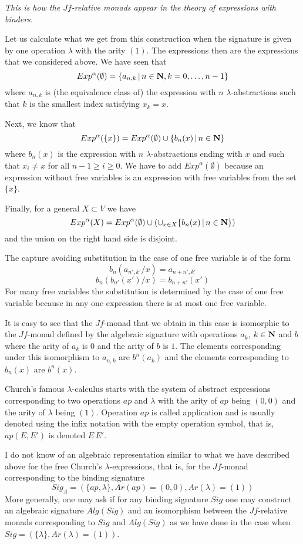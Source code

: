 \documentclass[12pt]{amsart}
\newcommand{\nn}{{\bf N\rm}}
\newcommand{\nat}{\nn}
\begin{document}
{\em This is how the $Jf$-relative monads appear in the theory of expressions with binders.}

Let us calculate what we get from this construction when the signature is given by one operation $\lambda$ with the arity $(1)$. The expressions then are the expressions that we considered above. We have seen that 
%
$$Exp^{\alpha}(\emptyset)=\{a_{n,k}\,|\,n\in\nat,k=0,\dots,n-1\}$$
%
where $a_{n,k}$ is (the equivalence class of) the expression with $n$ $\lambda$-abstractions such that $k$ is the smallest index satisfying $x_k=x$. 

Next, we know that
%
$$Exp^{\alpha}(\{x\})=Exp^{\alpha}(\emptyset)\cup \{b_n(x)\,|\,n\in \nat\}$$
%
where $b_n(x)$ is the expression with $n$ $\lambda$-abstractions ending with $x$ and such that $x_i\ne x$ for all $n-1\ge i\ge 0$. We have to add $Exp^{\alpha}(\emptyset)$ because an expression without free variables is an expression with free variables from the set $\{x\}$. 

Finally, for a general $X\subset V$ we have
%
$$Exp^{\alpha}(X)=Exp^{\alpha}(\emptyset)\cup (\cup_{x\in X}\{b_n(x)\,|\,n\in \nat\})$$
%
and the union on the right hand side is disjoint. 

The capture avoiding substitution in the case of one free variable is of the form
%
$$b_n(a_{n',k'}/x)=a_{n+n',k'}$$
$$b_n(b_{n'}(x')/x)=b_{n+n'}(x')$$
%
For many free variables the substitution is determined by the case of one free variable because in any one expression there is at most one free variable. 

It is easy to see that the $Jf$-monad that we obtain in this case is isomorphic to the $Jf$-monad defined by the algebraic signature with operations $a_k$, $k\in\nat$ and $b$ where the arity of $a_k$ is $0$ and the arity of $b$ is $1$. The elements corresponding under this isomorphism to $a_{n,k}$ are $b^n(a_k)$ and the elements corresponding to $b_n(x)$ are $b^n(x)$. 

Church's famous $\lambda$-calculus starts with the system of abstract expressions corresponding to two operations $ap$ and $\lambda$ with the arity of $ap$ being $(0,0)$ and the arity of $\lambda$ being $(1)$. Operation $ap$ is called application and is usually denoted using the infix notation with the empty operation symbol, that is, $ap(E,E')$ is denoted $E\,E'$. 

I do not know of an algebraic representation similar to what we have described above for the free Church's $\lambda$-expressions, that is, for the  $Jf$-monad corresponding to the binding signature 
%
$$Sig_{\Lambda}=(\{ap,\lambda\}, Ar(ap)=(0,0), Ar(\lambda)=(1))$$
%
More generally, one may ask if for any binding signature $Sig$ one may construct an algebraic signature $Alg(Sig)$ and an isomorphism between the $Jf$-relative monads corresponding to $Sig$ and $Alg(Sig)$ as we have done in the case when $Sig=(\{\lambda\},Ar(\lambda)=(1))$. 
\end{document}

